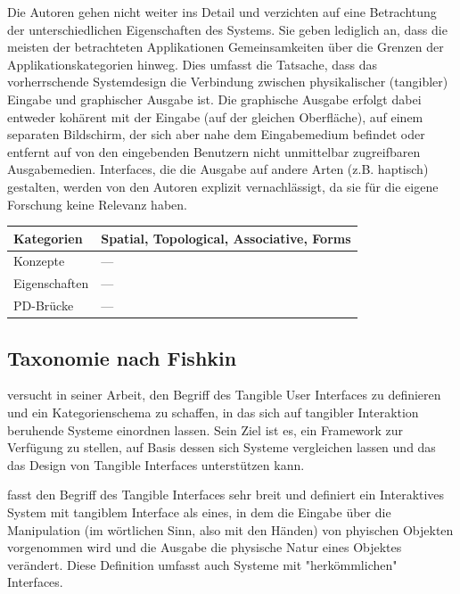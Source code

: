 Die Autoren gehen nicht weiter ins Detail und verzichten auf eine Betrachtung der unterschiedlichen Eigenschaften des Systems. Sie geben lediglich an, dass die meisten der betrachteten Applikationen Gemeinsamkeiten über die Grenzen der Applikationskategorien hinweg. Dies umfasst die Tatsache, dass das vorherrschende Systemdesign die Verbindung zwischen physikalischer (tangibler) Eingabe und graphischer Ausgabe ist. Die graphische Ausgabe erfolgt dabei entweder kohärent mit der Eingabe (auf der gleichen Oberfläche), auf einem separaten Bildschirm, der sich aber nahe dem Eingabemedium befindet oder entfernt auf von den eingebenden Benutzern nicht unmittelbar zugreifbaren Ausgabemedien. Interfaces, die die Ausgabe auf andere Arten (z.B. haptisch) gestalten, werden von den Autoren explizit vernachlässigt, da sie für die eigene Forschung keine Relevanz haben.

\begin{tabular}{| p{3cm} | p{10cm} |}
  \hline
  Kategorien & Spatial, Topological, Associative, Forms \\ \hline
  Konzepte & --- \\ \hline
  Eigenschaften & --- \\ \hline
  PD-Brücke & --- \\ \hline
\end{tabular} 


\subsection{Taxonomie nach Fishkin}
\label{sub:taxonomie_fishkin}

\citet{Fishkin04} versucht in seiner Arbeit, den Begriff des Tangible User Interfaces zu definieren und ein Kategorienschema zu schaffen, in das sich auf tangibler Interaktion beruhende Systeme einordnen lassen. Sein Ziel ist es, ein Framework zur Verfügung zu stellen, auf Basis dessen sich Systeme vergleichen lassen und das das Design von Tangible Interfaces unterstützen kann.

\citeauthor{Fishkin04} fasst den Begriff des Tangible Interfaces sehr breit und definiert ein Interaktives System mit tangiblem Interface als eines, in dem die Eingabe über die Manipulation (im wörtlichen Sinn, also mit den Händen) von phyischen Objekten vorgenommen wird und die Ausgabe die physische Natur eines Objektes verändert. Diese Definition umfasst auch Systeme mit "herkömmlichen" Interfaces.


